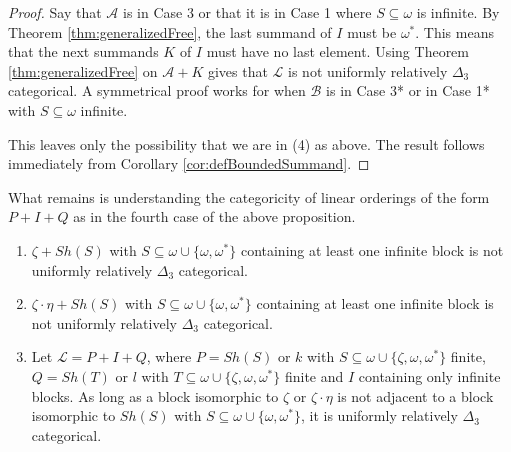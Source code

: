 \documentclass[11pt]{amsart}
\theoremstyle{definition}
\def\A{\mathcal A}
\def\B{\mathcal{B}}
\def\L{\mathcal L}
\begin{document}
    \begin{proof}
        Say that $\A$ is in Case 3 or that it is in Case 1 where $S\subseteq\omega$ is infinite.
        By Theorem \ref{thm:generalizedFree}, the last summand of $I$ must be $\omega^*$.
        This means that the next summands $K$ of $I$ must have no last element. 
        Using Theorem \ref{thm:generalizedFree} on $\A+K$ gives that $\L$ is not uniformly relatively $\Delta_3$ categorical.
        A symmetrical proof works for when $\B$ is in Case 3* or in Case 1* with $S\subseteq\omega$ infinite.
        
        This leaves only the possibility that we are in (4) as above.
        The result follows immediately from Corollary \ref{cor:defBoundedSummand}.
     \end{proof}

    What remains is understanding the categoricity of linear orderings of the form $P+I+Q$ as in the fourth case of the above proposition.

    \begin{proposition}\label{prop:infiniteAnalysis}
        \begin{enumerate}
            \item $\zeta+Sh(S)$ with $S\subseteq\omega\cup\{\omega,\omega^*\}$ containing at least one infinite block is not uniformly relatively $\Delta_3$ categorical.
            \item $\zeta\cdot\eta+Sh(S)$ with $S\subseteq\omega\cup\{\omega,\omega^*\}$ containing at least one infinite block is not uniformly relatively $\Delta_3$ categorical.
            \item Let $\L=P+I+Q$, where $P=Sh(S)$ or $k$ with $S\subseteq\omega\cup\{\zeta,\omega,\omega^*\}$ finite, $Q=Sh(T)$ or $l$ with $T\subseteq\omega\cup\{\zeta,\omega,\omega^*\}$ finite and $I$ containing only infinite blocks. As long as a block isomorphic to $\zeta$ or $\zeta\cdot\eta$ is not adjacent to a block isomorphic to $Sh(S)$ with $S\subseteq\omega\cup\{\omega,\omega^*\}$, it is uniformly relatively $\Delta_3$ categorical.
        \end{enumerate}
    \end{proposition}
\end{document}
